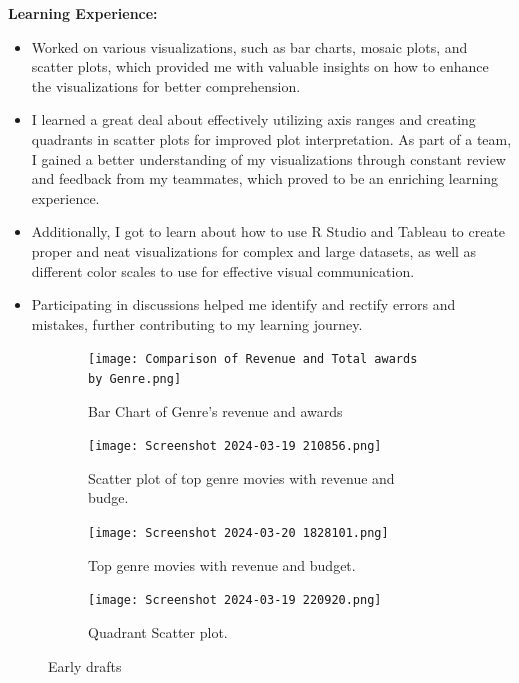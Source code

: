 \documentclass[12pt]{article}
\begin{document}
\textbf{Learning Experience:}
\begin{itemize}
    \item Worked on various visualizations, such as bar charts, mosaic plots, and scatter plots, which provided me with valuable insights on how to enhance the visualizations for better comprehension. 
    \item I learned a great deal about effectively utilizing axis ranges and creating quadrants in scatter plots for improved plot interpretation. As part of a team, I gained a better understanding of my visualizations through constant review and feedback from my teammates, which proved to be an enriching learning experience.
    \item Additionally, I got to learn about how to use R Studio and Tableau to create proper and neat visualizations for complex and large datasets, as well as different color scales to use for effective visual communication. 
    \item Participating in discussions helped me identify and rectify errors and mistakes, further contributing to my learning journey.
    \end{itemize}

\begin{figure}[H]
\centering

\begin{subfigure}[b]{0.32\textwidth}
\centering
\texttt{[image: Comparison of Revenue and Total awards by Genre.png]}
\label{fig:sub1}
\caption{Bar Chart of Genre's revenue and awards}
\end{subfigure}
\begin{subfigure}[b]{0.32\textwidth}
\centering
\texttt{[image: Screenshot 2024-03-19 210856.png]}
\label{fig:sub1}
\caption{Scatter plot of top genre movies with revenue and budge.}
\end{subfigure}
\begin{subfigure}[b]{0.32\textwidth}
\centering
\texttt{[image: Screenshot 2024-03-20 1828101.png]}
\label{fig:sub1}
\caption{Top genre movies with revenue and budget.}
\end{subfigure}
\begin{subfigure}[b]{0.32\textwidth}
\centering
\texttt{[image: Screenshot 2024-03-19 220920.png]}
\label{fig:sub1}
\caption{Quadrant Scatter plot.}
\end{subfigure}
\caption{Early drafts}
        \label{fig:test}
\end{figure}
\newpage
\end{document}
